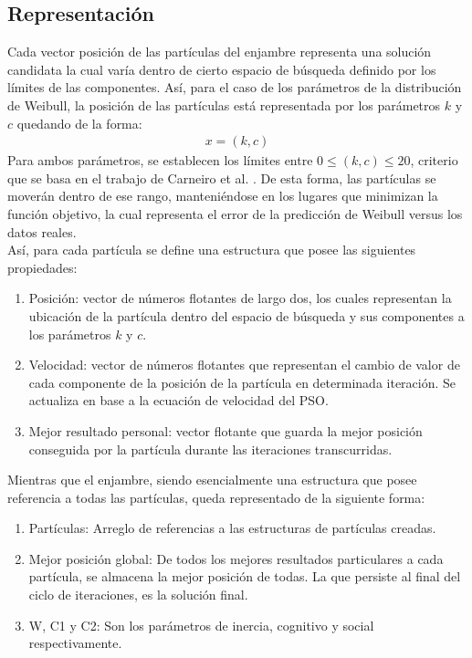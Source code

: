 \subsection{Representación}
Cada vector posición de las partículas del enjambre representa una solución candidata la cual varía dentro de cierto espacio de búsqueda definido por los límites de las componentes. Así, para el caso de los parámetros de la distribución de Weibull, la posición de las partículas está representada por los parámetros $k$ y $c$ quedando de la forma:
\begin{align}
    x = (k, c)
\end{align}    
Para ambos parámetros, se establecen los límites entre $0 \leq (k,c) \leq 20$, criterio que se basa en el trabajo de Carneiro et al. \cite{Carneiro15}. De esta forma, las partículas se moverán dentro de ese rango, manteniéndose en los lugares que minimizan la función objetivo, la cual representa el error de la predicción de Weibull versus los datos reales.\\
Así, para cada partícula se define una estructura que posee las siguientes propiedades: 
\begin{enumerate}\label{rep:Particle}
    \item Posición: vector de números flotantes de largo dos, los cuales representan la ubicación de la partícula dentro del espacio de búsqueda y sus componentes a los parámetros $k$ y $c$.
    \item Velocidad: vector de números flotantes que representan el cambio de valor de cada componente de la posición de la partícula en determinada iteración. Se actualiza en base a la ecuación de velocidad del PSO.
    \item Mejor resultado personal: vector flotante que guarda la mejor posición conseguida por la partícula durante las iteraciones transcurridas.    
\end{enumerate}        
Mientras que el enjambre, siendo esencialmente una estructura que posee referencia a todas las partículas, queda representado de la siguiente forma:
\begin{enumerate}\label{rep:Swarm}
    \item Partículas: Arreglo de referencias a las estructuras de partículas creadas.
    \item Mejor posición global: De todos los mejores resultados particulares a cada partícula, se almacena la mejor posición de todas. La que persiste al final del ciclo de iteraciones, es la solución final.
    \item W, C1 y C2: Son los parámetros de inercia, cognitivo y social respectivamente.    
\end{enumerate} 

